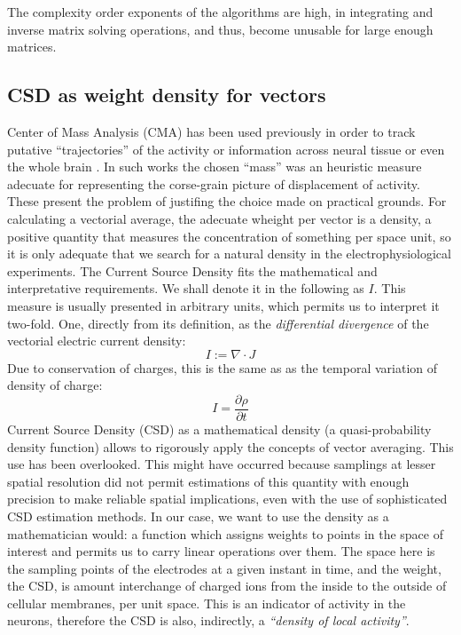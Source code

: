 \documentclass{article}
\begin{document}
The complexity order exponents of the algorithms are high, in integrating and inverse matrix solving operations, and thus, become unusable for large enough matrices. 


\subsection{CSD as weight density for vectors}


Center of Mass Analysis (CMA) has been used previously in order to track putative  ``trajectories'' of the activity or information across neural tissue or even the whole brain \cite{Chao05, Chao07, Manjarrez07, Manjarrez09}. In such works the chosen ``mass'' was an heuristic measure adecuate for representing the corse-grain picture of displacement of activity. These present the problem of justifing the choice made on practical grounds. For calculating a vectorial average, the adecuate wheight per vector is a density, a positive quantity that measures the concentration of something per space unit, so it is only adequate that we search for a natural density in the electrophysiological experiments. The Current Source Density fits the mathematical and interpretative requirements. We shall denote it in the following as $I$.  This measure is usually presented in arbitrary units, which permits us to interpret it two-fold. One, directly from its definition, as the \emph{differential divergence} of the vectorial electric current density:
\begin{equation}
  I:=\nabla \cdot J
\end{equation}
Due to conservation of charges, this is the same as as the temporal variation of density of charge:
\begin{equation}
  I=\frac{\partial \rho}{\partial t}
\end{equation}
Current Source Density (CSD) as a mathematical density (a quasi-probability density function)  allows  to rigorously apply the concepts of vector averaging. This use has been overlooked. This might have occurred because  samplings at lesser spatial resolution did not permit estimations of this quantity with enough precision to make reliable spatial implications, even with the use of sophisticated CSD estimation methods. In our case, we want to use the density as a mathematician would: a function which assigns weights to points in the space of interest and permits us to carry linear operations over them.  The space here is the sampling points of the electrodes at a given instant in time, and the weight, the CSD, is amount interchange of charged ions from the inside to the outside of cellular membranes, per unit space.  This is an indicator of activity in the neurons, therefore the CSD is also, indirectly, a \emph{``density of local activity''}.
\end{document}
